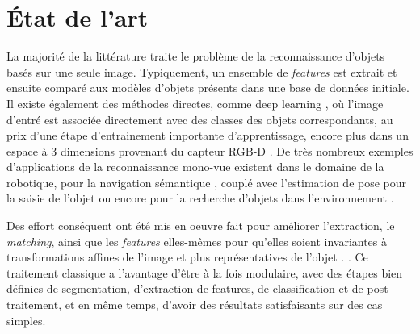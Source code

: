
\section{État de l'art}


La majorité de la littérature traite le problème de la reconnaissance d'objets basés sur une seule image. Typiquement, un ensemble de \textit{features}  est extrait et ensuite comparé aux modèles d'objets présents dans une base de données initiale. Il existe également des méthodes directes, comme deep learning , où l'image d'entré est associée directement avec des classes des objets correspondants, au prix d'une étape d'entrainement importante d'apprentissage, encore plus dans un espace à 3 dimensions provenant du capteur RGB-D . De très nombreux exemples d'applications de la reconnaissance mono-vue existent dans le domaine de la robotique, pour la navigation sémantique \cite{caron2014neural}, couplé avec l'estimation de pose pour la saisie de l'objet \cite{burel1995three} ou encore pour la recherche d'objets dans l'environnement \cite{kragic2009object,ali2014contextual}.

Des effort conséquent ont été mis en oeuvre fait pour améliorer l'extraction, le \textit {matching}, ainsi que les \textit{features} elles-mêmes pour qu'elles soient invariantes à transformations affines de l'image et plus représentatives de l'objet . . Ce traitement classique a l’avantage d'être à la fois modulaire, avec des étapes bien définies de segmentation, d'extraction de features, de classification et de post-traitement, et en même temps, d'avoir des résultats satisfaisants sur des cas simples. 

